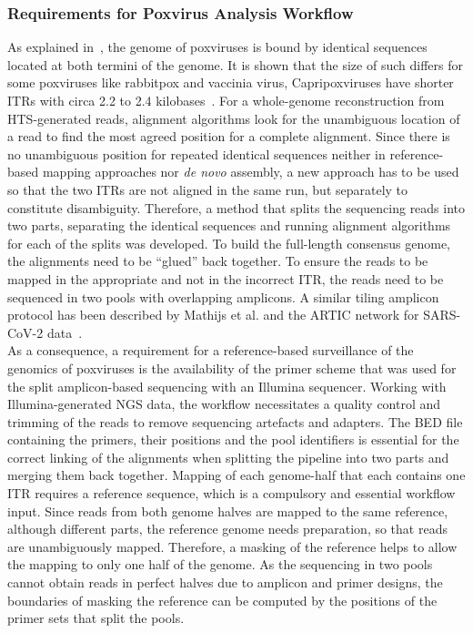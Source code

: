 \subsubsection{Requirements for Poxvirus Analysis Workflow}
As explained in~, the genome of poxviruses is bound by identical sequences located at both termini of the genome. It is shown that the size of such differs for some poxviruses like rabbitpox and vaccinia virus, Capripoxviruses have shorter \acp{ITR} with circa 2.2 to 2.4 kilobases~\cite{wittek1978inverted}. For a whole-genome reconstruction from \ac{HTS}-generated reads, alignment algorithms look for the unambiguous location of a read to find the most agreed position for a complete alignment. Since there is no unambiguous position for repeated identical sequences neither in reference-based mapping approaches nor \textit{de novo} assembly, a new approach has to be used so that the two \acp{ITR} are not aligned in the same run, but separately to constitute disambiguity. Therefore, a method that splits the sequencing reads into two parts, separating the identical sequences and running alignment algorithms for each of the splits was developed. To build the full-length consensus genome, the alignments need to be ``glued'' back together. To ensure the reads to be mapped in the appropriate and not in the incorrect \ac{ITR}, the reads need to be sequenced in two pools with overlapping amplicons. A similar tiling amplicon protocol has been described by Mathijs et al. and the ARTIC network for \ac{SARS-CoV-2} data~\cite{tyson2020improvements, mathijs2022robust}. \\
As a consequence, a requirement for a reference-based surveillance of the genomics of poxviruses is the availability of the primer scheme that was used for the split amplicon-based sequencing with an Illumina sequencer. Working with Illumina-generated \ac{NGS} data, the workflow necessitates a quality control and trimming of the reads to remove sequencing artefacts and adapters. The \ac{BED} file containing the primers, their positions and the pool identifiers is essential for the correct linking of the alignments when splitting the pipeline into two parts and merging them back together. Mapping of each genome-half that each contains one \ac{ITR} requires a reference sequence, which is a compulsory and essential workflow input. Since reads from both genome halves are mapped to the same reference, although different parts, the reference genome needs preparation, so that reads are unambiguously mapped. Therefore, a masking of the reference helps to allow the mapping to only one half of the genome. As the sequencing in two pools cannot obtain reads in perfect halves due to amplicon and primer designs, the boundaries of masking the reference can be computed by the positions of the primer sets that split the pools. \\
